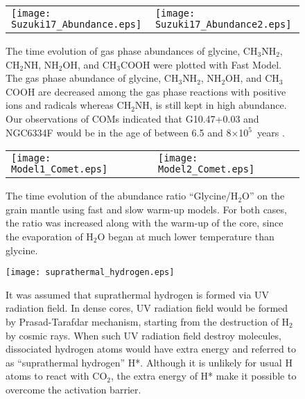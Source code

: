 \documentclass{aastex61}
\begin{document}
\begin{figure}
 \begin{tabular}{ll}
\texttt{[image: Suzuki17\_Abundance.eps]}&
\texttt{[image: Suzuki17\_Abundance2.eps]}\\
  \end{tabular}
\caption{
The time evolution of gas phase abundances of glycine, CH$_3$NH$_2$, CH$_2$NH, NH$_2$OH, and CH$_3$COOH were plotted with Fast Model.
%
The gas phase abundance of glycine, CH$_3$NH$_2$, NH$_2$OH, and CH$_3$COOH are  decreased among the gas phase reactions with positive ions and radicals whereas CH$_2$NH, is still kept in high abundance.
%
Our observations of COMs indicated that G10.47+0.03 and NGC6334F would be in the age of between 6.5 and 8$\times$10$^{5}$~years \citep{Suzuki17}.
%
\label{fig:Glycine_Suzuki17}
}
\end{figure}
\clearpage


\begin{figure}
 \begin{tabular}{ll}
\texttt{[image: Model1\_Comet.eps]}&
\texttt{[image: Model2\_Comet.eps]}\\
  \end{tabular}
\caption{
The time evolution of the abundance ratio ``Glycine/H$_2$O'' on the grain mantle using fast and slow warm-up models. 
%
For both cases, the ratio was increased along with the warm-up of the core, since the evaporation of H$_2$O began at much lower temperature than glycine.
\label{fig:Glycine_Comet}
}
\end{figure}
\clearpage

\begin{figure}
\texttt{[image: suprathermal\_hydrogen.eps]}
\caption{
It was assumed that suprathermal hydrogen is formed via UV radiation field.
%
In dense cores, UV radiation field would be formed by Prasad-Tarafdar mechanism, starting from the destruction of H$_2$ by cosmic rays.
%
When such UV radiation field destroy molecules, dissociated hydrogen atoms would have extra energy and referred to as ``suprathermal hydrogen'' H*.
%
Although it is unlikely for usual H atoms to react with CO$_2$, the extra energy of H* make it possible to overcome the activation barrier. 
\label{fig:suprathermal_hydrogen}
}
\end{figure}
\clearpage
\end{document}
